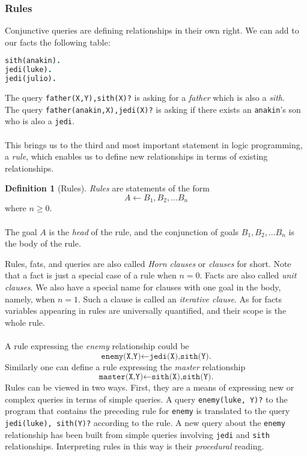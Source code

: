 \documentclass{report}
\theoremstyle{definition}
\theoremstyle{definition}
\newtheorem*{definition*}{Definition}
\newcommand{\ttt}[1]{\texttt{#1}}
\begin{document}
\subsubsection{Rules}
Conjunctive queries are defining relationships in their own right. We can add to our facts the following table:
\begin{lstlisting}[language=Prolog, caption=Force-Side Relationship]
sith(anakin).
jedi(luke).
jedi(julio).
\end{lstlisting}
The query \ttt{father(X,Y),sith(X)?} is asking for a \textit{father} which is also a \textit{sith}.\\
The query \ttt{father(anakin,X),jedi(X)?} is asking if there exists an \ttt{anakin}'s son who is also a \ttt{jedi}.\\\\
This brings us to the third and most important statement in logic programming, a \textit{rule}, which enables us to define new relationships in terms of existing relationships.
\pagebreak
\begin{definition*}[Rules]
	\textit{Rules} are statements of the form $$A \leftarrow B_1, B_2, \ldots B_n$$ where $n \geq 0$.\\\\
	The goal $A$ is the \textit{head} of the rule, and the conjunction of goals $B_1, B_2, \ldots B_n$ is the body of the rule.
\end{definition*}
Rules, fats, and queries are also called \textit{Horn clauses} or \textit{clauses} for short. Note that a fact is just a special case of a rule when $n = 0$. Facts are also called \textit{unit clauses}. We also have a special name for clauses with one goal in the body, namely, when $n = 1$. Such a clause is called an \textit{iterative clause}. As for facts variables appearing in rules are universally quantified, and their scope is the whole rule.\\\\
A rule expressing the \textit{enemy} relationship could be
\begin{equation*}
	\ttt{enemy(X,Y)} \leftarrow \ttt{jedi(X),sith(Y).}
\end{equation*}
Similarly one can define a rule expressing the \textit{master} relationship
\begin{equation*}
	\ttt{master(X,Y)} \leftarrow \ttt{sith(X),sith(Y).}
\end{equation*}
Rules can be viewed in two ways. First, they are a means of expressing new or complex queries in terms of simple queries. A query \ttt{enemy(luke, Y)?} to the program that contains the preceding rule for \ttt{enemy} is translated to the query \ttt{jedi(luke), sith(Y)?} according to the rule. A new query about the \ttt{enemy} relationship has been built from simple queries involving \ttt{jedi} and \ttt{sith} relationships. Interpreting rules in this way is their \textit{procedural} reading.\\\\
\end{document}
